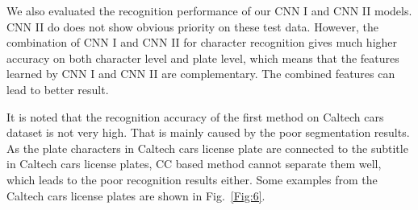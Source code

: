 \documentclass[twocolumn]{svjour3}
\begin{document}
We also evaluated the recognition performance of our CNN I and CNN II models. CNN II do does not show obvious priority on these test data. However, the combination of CNN I and CNN II for character recognition gives much higher accuracy on both character level and plate level, which means that the features learned by CNN I and CNN II are complementary. The combined features can lead to better result.

It is noted that the recognition accuracy of the first method on Caltech cars dataset is not very high. That is mainly caused by the poor segmentation results. As the plate characters in Caltech cars license plate are  connected to the subtitle in Caltech cars license plates, CC based method cannot separate them well, which leads to the poor recognition results either. Some examples from the Caltech cars license plates are shown in Fig.~\ref{Fig:6}.
\end{document}
